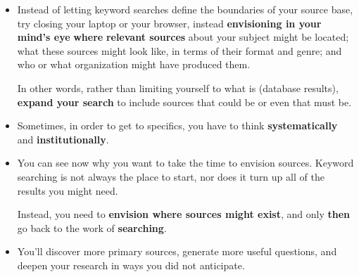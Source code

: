 \documentclass[11pt]{article}
\begin{document}
\begin{itemize}
\begin{exercise}
\begin{itemize}
\item Instead of letting keyword searches define the boundaries of your source base, try closing your laptop or your browser, instead \textbf{envisioning in your mind’s eye} \textbf{where} \textbf{relevant sources} about your subject might be located; what these sources might look like, in terms of their format and genre; and who or what organization might have produced them. 

In other words, rather than limiting yourself to what is (database results), \textbf{expand your search} to include sources that could be or even that must be.

\item Sometimes, in order to get to specifics, you have to think \textbf{systematically} and \textbf{institutionally}.

\item You can see now why you want to take the time to envision sources. Keyword searching is not always the place to start, nor does it turn up all of the results you might need.

Instead, you need to \textbf{envision where sources might exist}, and only \textbf{then} go back to the work of \textbf{searching}.

\item You’ll discover more primary sources, generate more useful questions, and deepen your research in ways you did not anticipate.
\end{itemize}
\end{exercise} 
\end{itemize}
\end{document}
